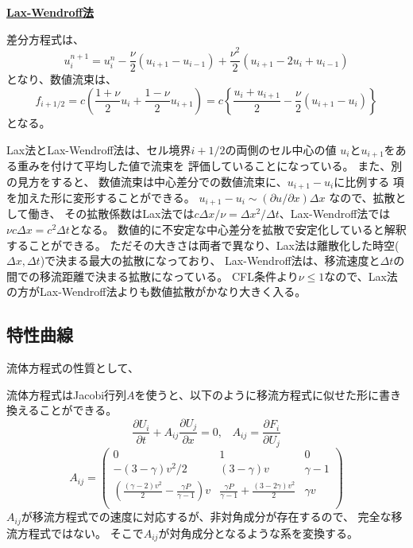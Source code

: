 \noindent
\underline{\bf Lax-Wendroff法}

差分方程式\citep{LaxWendroff1960}は、
\begin{equation}
    u_i^{n+1} = u_i^n 
    - \frac{\nu}{2} \left( u_{i+1} - u_{i-1}\right)
    + \frac{\nu^2}{2} \left( u_{i+1} - 2u_i + u_{i-1}\right)
\end{equation}
となり、数値流束は、
\begin{equation}
    f_{i+1/2} = 
    c\left(
    \frac{1+\nu}{2} u_{i}
    + \frac{1-\nu}{2} u_{i+1}
    \right)
    = 
    c\left\{
    \frac{u_i+u_{i+1}}{2}
     - \frac{\nu}{2}(u_{i+1} - u_i) 
    \right\}
\end{equation}
となる。

Lax法とLax-Wendroff法は、セル境界$i+1/2$の両側のセル中心の値
$u_i$と$u_{i+1}$をある重みを付けて平均した値で流束を
評価していることになっている。
また、別の見方をすると、
数値流束は中心差分での数値流束に、$u_{i+1}-u_i$に比例する
項を加えた形に変形することができる。
$u_{i+1}-u_i \sim (\partial u/\partial x)\Delta x$
なので、拡散として働き、
その拡散係数はLax法では$c\Delta x/\nu=\Delta x^2/\Delta t$、Lax-Wendroff法では
$\nu c\Delta x=c^2\Delta t $となる。
数値的に不安定な中心差分を拡散で安定化していると解釈することができる。
ただその大きさは両者で異なり、Lax法は離散化した時空($\Delta x, \Delta t$)で決まる最大の拡散になっており、
Lax-Wendroff法は、移流速度と$\Delta t$の間での移流距離で決まる拡散になっている。
CFL条件より$\nu\le 1$なので、Lax法の方がLax-Wendroff法よりも数値拡散がかなり大きく入る。





\subsection{特性曲線}

流体方程式の性質として、


流体方程式はJacobi行列$A$を使うと、以下のように移流方程式に似せた形に書き換えることができる。
\begin{equation}
    \frac{\partial U_i}{\partial t} 
    + A_{ij} \frac{\partial U_j}{\partial x}=0,\;\;\;A_{ij} = \frac{\partial F_i}{\partial U_j}
\end{equation}
\begin{equation}
    A_{ij} = \left( 
        \begin{array}{ccc}
         0  & 1 & 0 \\
       \displaystyle - (3-\gamma)v^2/2  & (3-\gamma) v & \gamma - 1 \\ 
       \displaystyle  
       \left(\frac{(\gamma-2)v^2}{2} - 
       \frac{\gamma P}{\gamma-1} \right)v & 
       \displaystyle \frac{\gamma P}{\gamma-1} +
       \frac{(3-2\gamma)v^2}{2} & \gamma v\\
        \end{array}
    \right)
\end{equation}
$A_{ij}$が移流方程式での速度に対応するが、非対角成分が存在するので、
完全な移流方程式ではない。
そこで$A_{ij}$が対角成分となるような系を変換する。

